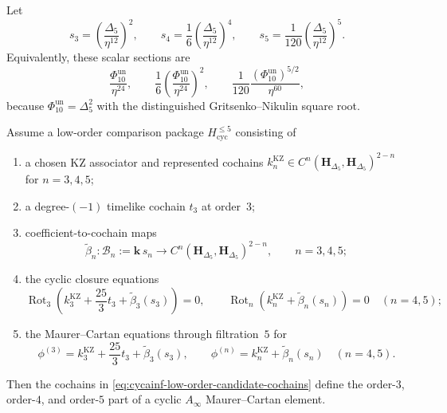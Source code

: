 \begin{proposition}
\label{prop:cyclic-invariance-phi-345}
Let
\[
 s_3=\left(\frac{\Delta_5}{\eta^{12}}\right)^{\!2},
 \qquad
 s_4=\frac1{6}\left(\frac{\Delta_5}{\eta^{12}}\right)^{\!4},
 \qquad
 s_5=\frac1{120}\left(\frac{\Delta_5}{\eta^{12}}\right)^{\!5}.
\]
Equivalently, these scalar sections are
\[
 \frac{\Phi_{10}^{\mathrm{un}}}{\eta^{24}},
 \qquad
 \frac1{6}\left(
 \frac{\Phi_{10}^{\mathrm{un}}}{\eta^{24}}\right)^{\!2},
 \qquad
 \frac1{120}
 \frac{(\Phi_{10}^{\mathrm{un}})^{5/2}}{\eta^{60}},
\]
because $\Phi_{10}^{\mathrm{un}}=\Delta_5^2$ with the distinguished
Gritsenko--Nikulin square root.

Assume a low-order comparison package
$H_{\mathrm{cyc}}^{\leq5}$ consisting of
\begin{enumerate}[label=\textup{(\roman*)}]
\item a chosen KZ associator and represented cochains
$k_n^{\mathrm{KZ}}\in
 C^n(\mathbf H_{\Delta_5},\mathbf H_{\Delta_5})^{2-n}$ for
$n=3,4,5$;
\item a degree-$(-1)$ timelike cochain $t_3$ at order~$3$;
\item coefficient-to-cochain maps
\[
 \widetilde\beta_n\colon
 \mathscr B_n:=\mathbf k\,s_n
 \longrightarrow
 C^n(\mathbf H_{\Delta_5},\mathbf H_{\Delta_5})^{2-n},
 \qquad n=3,4,5;
\]
\item the cyclic closure equations
\[
 \operatorname{Rot}_3\!\left(
 k_3^{\mathrm{KZ}}+\frac{25}{3}t_3+\widetilde\beta_3(s_3)\right)=0,
 \qquad
 \operatorname{Rot}_n\!\left(
 k_n^{\mathrm{KZ}}+\widetilde\beta_n(s_n)\right)=0
 \quad(n=4,5);
\]
\item the Maurer--Cartan equations through filtration~$5$ for
\begin{equation}
\label{eq:cycainf-low-order-candidate-cochains}
 \phi^{(3)}
 =k_3^{\mathrm{KZ}}+\frac{25}{3}t_3+\widetilde\beta_3(s_3),
 \qquad
 \phi^{(n)}=k_n^{\mathrm{KZ}}+\widetilde\beta_n(s_n)
 \quad(n=4,5).
\end{equation}
\end{enumerate}
Then the cochains in
\eqref{eq:cycainf-low-order-candidate-cochains} define the
order-$3$, order-$4$, and order-$5$ part of a cyclic
$A_\infty$ Maurer--Cartan element.
\end{proposition}

